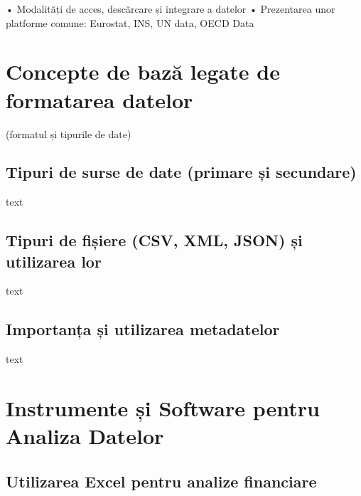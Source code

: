 \documentclass[
  11pt,
  b5paper,
  nottoc]{book}
\begin{document}
• Modalități de acces, descărcare și integrare a datelor • Prezentarea
unor platforme comune: Eurostat, INS, UN data, OECD Data

\hypertarget{concepte-de-bazux103-legate-de-formatarea-datelor-2}{%
\section{Concepte de bază legate de formatarea
datelor}\label{concepte-de-bazux103-legate-de-formatarea-datelor-2}}

(formatul și tipurile de date)

\hypertarget{tipuri-de-surse-de-date-primare-ux219i-secundare-2}{%
\subsection{Tipuri de surse de date (primare și
secundare)}\label{tipuri-de-surse-de-date-primare-ux219i-secundare-2}}

text

\hypertarget{tipuri-de-fiux219iere-csv-xml-json-ux219i-utilizarea-lor-2}{%
\subsection{Tipuri de fișiere (CSV, XML, JSON) și utilizarea
lor}\label{tipuri-de-fiux219iere-csv-xml-json-ux219i-utilizarea-lor-2}}

text

\hypertarget{importanux21ba-ux219i-utilizarea-metadatelor-2}{%
\subsection{Importanța și utilizarea
metadatelor}\label{importanux21ba-ux219i-utilizarea-metadatelor-2}}

text

\hypertarget{instrumente-ux219i-software-pentru-analiza-datelor-2}{%
\section{Instrumente și Software pentru Analiza
Datelor}\label{instrumente-ux219i-software-pentru-analiza-datelor-2}}

\hypertarget{utilizarea-excel-pentru-analize-financiare-2}{%
\subsection{Utilizarea Excel pentru analize
financiare}\label{utilizarea-excel-pentru-analize-financiare-2}}
\end{document}
